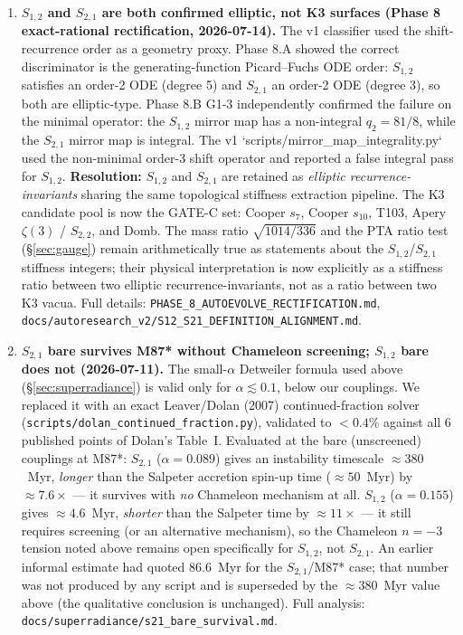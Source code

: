 \documentclass[11pt,a4paper]{article}
\begin{document}
\begin{enumerate}
    \item \textbf{$S_{1,2}$ and $S_{2,1}$ are both confirmed elliptic, not K3 surfaces (Phase 8 exact-rational rectification, 2026-07-14).} The v1 classifier used the shift-recurrence order as a geometry proxy. Phase 8.A showed the correct discriminator is the generating-function Picard--Fuchs ODE order: $S_{1,2}$ satisfies an order-2 ODE (degree 5) and $S_{2,1}$ an order-2 ODE (degree 3), so both are elliptic-type. Phase 8.B G1-3 independently confirmed the failure on the minimal operator: the $S_{1,2}$ mirror map has a non-integral $q_2 = 81/8$, while the $S_{2,1}$ mirror map is integral. The v1 `scripts/mirror\_map\_integrality.py` used the non-minimal order-3 shift operator and reported a false integral pass for $S_{1,2}$. \textbf{Resolution:} $S_{1,2}$ and $S_{2,1}$ are retained as \emph{elliptic recurrence-invariants} sharing the same topological stiffness extraction pipeline. The K3 candidate pool is now the GATE-C set: Cooper $s_7$, Cooper $s_{10}$, T103, Apery $\zeta(3)$ / $S_{2,2}$, and Domb. The mass ratio $\sqrt{1014/336}$ and the PTA ratio test (\S\ref{sec:gauge}) remain arithmetically true as statements about the $S_{1,2}$/$S_{2,1}$ stiffness integers; their physical interpretation is now explicitly as a stiffness ratio between two elliptic recurrence-invariants, not as a ratio between two K3 vacua. Full details: \texttt{PHASE\_8\_AUTOEVOLVE\_RECTIFICATION.md}, \texttt{docs/autoresearch\_v2/S12\_S21\_DEFINITION\_ALIGNMENT.md}.
    \item \textbf{$S_{2,1}$ bare survives M87* without Chameleon screening; $S_{1,2}$ bare does not (2026-07-11).} The small-$\alpha$ Detweiler formula used above (\S\ref{sec:superradiance}) is valid only for $\alpha\lesssim0.1$, below our couplings. We replaced it with an exact Leaver/Dolan (2007) continued-fraction solver (\texttt{scripts/dolan\_continued\_fraction.py}), validated to $<0.4\%$ against all 6 published points of Dolan's Table~I. Evaluated at the bare (unscreened) couplings at M87*: $S_{2,1}$ ($\alpha=0.089$) gives an instability timescale $\approx380$~Myr, \emph{longer} than the Salpeter accretion spin-up time ($\approx50$~Myr) by $\approx7.6\times$ — it survives with \emph{no} Chameleon mechanism at all. $S_{1,2}$ ($\alpha=0.155$) gives $\approx4.6$~Myr, \emph{shorter} than the Salpeter time by $\approx11\times$ — it still requires screening (or an alternative mechanism), so the Chameleon $n=-3$ tension noted above remains open specifically for $S_{1,2}$, not $S_{2,1}$. An earlier informal estimate had quoted $86.6$~Myr for the $S_{2,1}$/M87* case; that number was not produced by any script and is superseded by the $\approx380$~Myr value above (the qualitative conclusion is unchanged). Full analysis: \texttt{docs/superradiance/s21\_bare\_survival.md}.

\end{enumerate}
\end{document}
